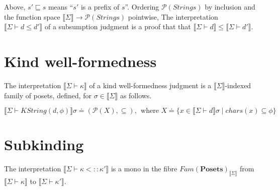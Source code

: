 \documentclass{article}
\newcommand{\mbf}{\mathbf}
\newcommand{\sem}[1]{\llbracket #1 \rrbracket}
\begin{document}
Above, $s' \sqsubseteq s$ means ``$s'$ is a prefix of $s$''.
Ordering $\mathcal P(\mathit{Strings})$ by inclusion and the function space $\sem{\Sigma} \to \mathcal P(\mathit{Strings})$ pointwise, 
The interpretation $\sem{\Sigma \vdash d \leq d'}$ of a subsumption judgment is a proof that that $\sem{\Sigma \vdash d} \leq \sem{\Sigma \vdash d'}$.

\section*{Kind well-formedness}


The interpretation $\sem{\Sigma \vdash \kappa}$ of a kind well-formedness judgment is a $\sem{\Sigma}$-indexed family of posets, defined, for $\sigma \in \sem{\Sigma}$ as follows.

$$\sem{\Sigma \vdash \mathit{KString}(d,\phi)} \sigma \doteq (\mathcal P(X), \subseteq),~~\text{where } X \doteq \{ x \in \sem{\Sigma \vdash d} \sigma \mid \mathit{chars}(x) \subseteq \phi \}$$

\section*{Subkinding}

The interpretation $\sem{\Sigma \vdash \kappa <:: \kappa'}$ is a mono in the fibre $\mathit{Fam}(\mbf{Posets})_{\sem{\Sigma}}$ from $\sem{\Sigma \vdash \kappa}$ to $\sem{\Sigma \vdash \kappa'}$.

\end{document}
